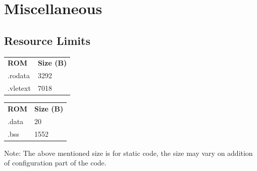 \chapter{Miscellaneous}

\section{Resource Limits}
\begin{tabu}{ |l|l| }
	\hline
	{\bfseries ROM} & {\bfseries Size (B)}\\ \tabucline[1pt]
	.rodata & 3292\\ \hline
	.vletext & 7018\\ \hline
\end{tabu}

\begin{tabu}{ |l|l| }
	\hline
	{\bfseries ROM} & {\bfseries Size (B)}\\ \tabucline[1pt]
	.data & 20\\ \hline
	.bss & 1552\\ \hline
\end{tabu}

Note: The above mentioned size is for static code, the size may vary on addition of configuration part of the code.